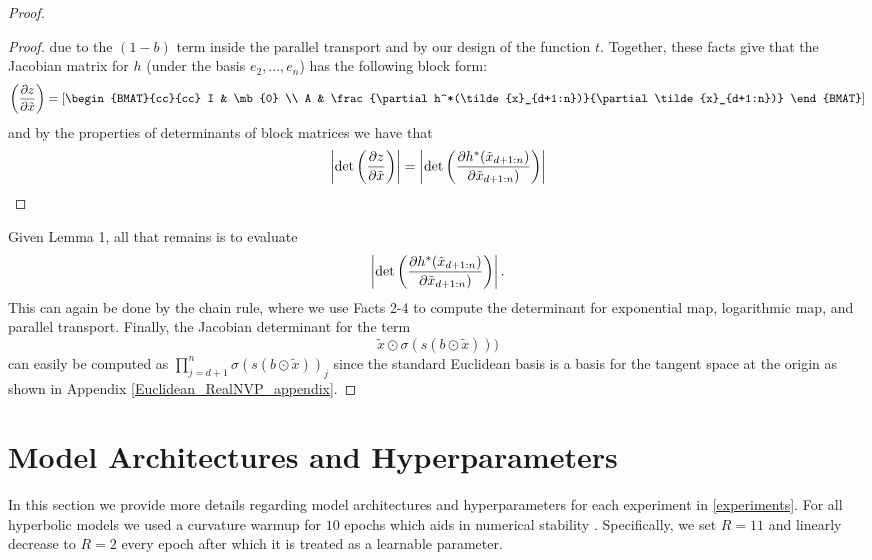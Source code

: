 \begin{proof}
\begin{proof}
due to the $(1-b)$ term inside the parallel transport and by our design of the function $t$. 
Together, these facts give that the Jacobian matrix for $h$ (under the basis $e_2, ..., e_n$) has the following block form:
\begin{equation}
   \left(\frac{\partial z}{\partial \tilde{x}}\right) = \left[\begin{BMAT}{cc}{cc}
    I & \mb{0} \\
    A & \frac{\partial h^*(\tilde{x}_{d+1:n})}{\partial \tilde{x}_{d+1:n})}
    \end{BMAT}\right]
\end{equation}
and by the properties of determinants of block matrices we have that
\begin{equation}
    \left|\textnormal{det}\left(\frac{\partial z}{\partial \tilde{x}}\right)\right| =    \left|\textnormal{det}\left(\frac{\partial h^*(\tilde{x}_{d+1:n})}{\partial \tilde{x}_{d+1:n})}\right)\right|
\end{equation}
\end{proof}
Given Lemma 1, all that remains is to evaluate 
\begin{equation}
    \left|\textnormal{det}\left(\frac{\partial h^*(\tilde{x}_{d+1:n})}{\partial \tilde{x}_{d+1:n})}\right)\right|.
\end{equation}
This can again be done by the chain rule, where we use Facts 2-4 to compute the determinant for exponential map, logarithmic map, and parallel transport.
Finally, the Jacobian determinant for the term
\begin{equation}
    \tilde{x} \odot \sigma(s(b \odot \tilde{x})))
\end{equation}
can easily be computed as $\prod_{j=d+1}^n\sigma(s(b \odot \tilde{x}))_j$ since the standard Euclidean basis is a basis for the tangent space at the origin as shown in Appendix \ref{Euclidean_RealNVP_appendix}.
\end{proof}

\cut{}

\section{Model Architectures and Hyperparameters}
\label{model_arch_and_hyperparams}
In this section we provide more details regarding model architectures and hyperparameters for each experiment in \ref{experiments}. For all hyperbolic models we used a curvature warmup for $10$ epochs which aids in numerical stability \citet{skopek2019mixed}. Specifically, we set $R=11$ and linearly decrease to $R=2$ every epoch after which it is treated as a learnable parameter. 

